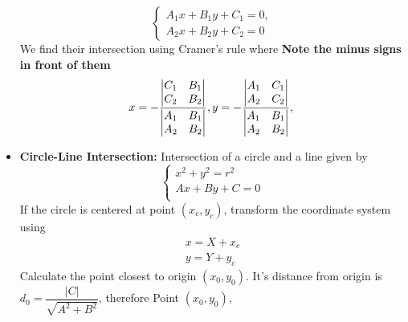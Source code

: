 \documentclass[15pt,a4paper]{article}
\begin{document}
\begin{landscape}
\begin{multicols*}{3}
\begin{itemize}
\begin{equation*}
        \begin{cases*}
            A_1x + B_1y + C_1 = 0,\\
            A_2x + B_2y + C_2 = 0
        \end{cases*}
    \end{equation*}
    We find their intersection using Cramer's rule where \textbf{Note the minus signs in front of them}
    \begin{equation*}
        x = -\dfrac{\begin{vmatrix}
                C_1 & B_1\\
                C_2 & B_2\\
            \end{vmatrix}}{\begin{vmatrix}
                A_1 & B_1\\
                A_2 & B_2\\
            \end{vmatrix}},
        \\
        y = -\dfrac{\begin{vmatrix}
                A_1 & C_1\\
                A_2 & C_2\\
            \end{vmatrix}}{\begin{vmatrix}
                A_1 & B_1\\
                A_2 & B_2\\
            \end{vmatrix}},\\       
    \end{equation*}
    \item \textbf{Circle-Line Intersection:} Intersection of a circle and a line given by
        \begin{equation*}
            \begin{cases}
                x^2 + y^2 = r^2 \\
                Ax + By + C = 0 \\
            \end{cases}
        \end{equation*}
        If the circle is centered at point $(x_c, y_c)$, transform the coordinate system using
        \begin{gather*}
            x = X + x_c\\
            y = Y + y_c
        \end{gather*}
    Calculate the point closest to origin $(x_0, y_0)$. It's distance from origin is $d_0 = \dfrac{|C|}{\sqrt{A^2 + B^2}}$, therefore Point $(x_0, y_0)$,

\end{itemize}
\end{multicols*}
\end{landscape}
\end{document}
